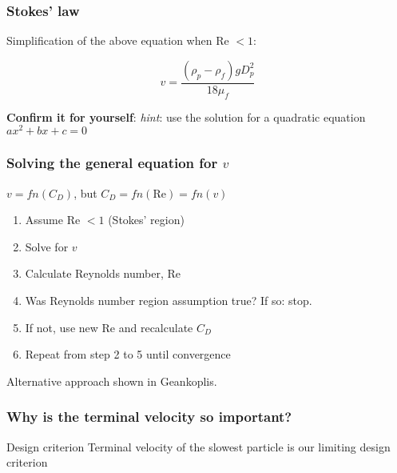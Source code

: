 \begin{frame}\frametitle{Stokes' law}
	
	Simplification of the above equation when Re $< 1$:
	
	\[
		v = \frac{\left( \rho_p - \rho_f \right) g D_p^2}{18 \mu_f}
	\]	
	
	\vspace{12pt}
	\textbf{Confirm it for yourself}: \emph{hint}: use the solution for a quadratic equation $ax^2 + bx + c = 0$
\end{frame}

\begin{frame}\frametitle{Solving the general equation for $v$}
	
	$v = fn(C_D)$, but $C_D = fn(\text{Re}) = fn(v)$
	
	\begin{enumerate}
		\item	Assume Re $< 1$ (Stokes' region)
		\item	Solve for $v$
		\item	Calculate Reynolds number, Re
		\item	Was Reynolds number region assumption true? If so: stop. 
		\item	If not, use new Re and recalculate $C_D$
		\item	Repeat from step 2 to 5 until convergence		
	\end{enumerate}
	
	\vspace{12pt}
	Alternative approach shown in Geankoplis.	
\end{frame}

\begin{frame}\frametitle{Why is the terminal velocity so important?}
	\begin{exampleblock}{Design criterion}
		Terminal velocity of the slowest particle is our limiting design criterion
	\end{exampleblock}
\end{frame}

